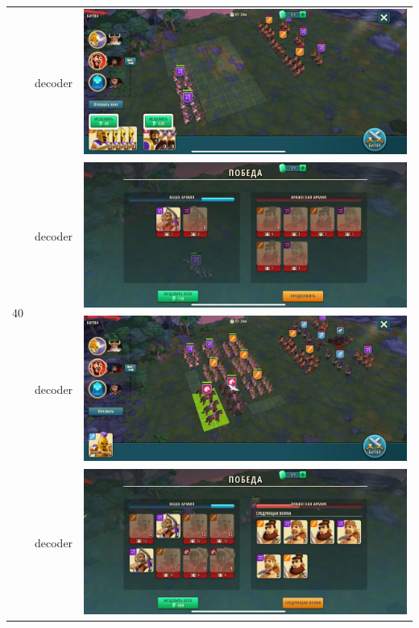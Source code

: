 \begin{longtable}{|c|c|c|}
    \hline
    \multirow{4}{*}{40} & decoder &
    \includegraphics[width=0.75\linewidth]{./parts/media/TreasureHunt/40/decoder/photo_2022-04-07_13-16-12.jpg} \\
    & decoder &
    \includegraphics[width=0.75\linewidth]{./parts/media/TreasureHunt/40/decoder/photo_2022-04-07_13-16-15.jpg} \\
    & decoder &
    \includegraphics[width=0.75\linewidth]{./parts/media/TreasureHunt/40/decoder/photo_2022-04-07_13-15-51.jpg} \\
    & decoder &
    \includegraphics[width=0.75\linewidth]{./parts/media/TreasureHunt/40/decoder/photo_2022-04-07_13-16-08.jpg} \\
    \hline
\end{longtable}
